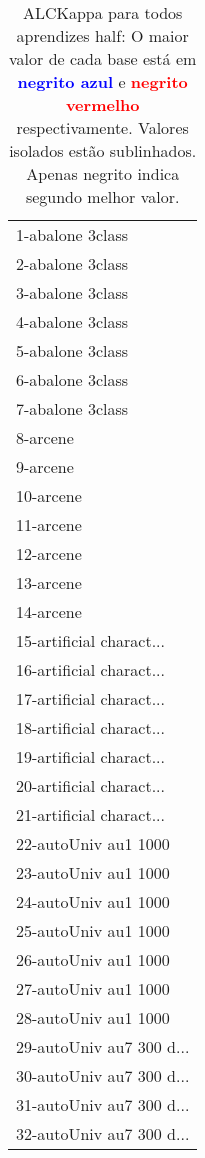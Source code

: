 \begin{table}[h]
\caption{ALCKappa para todos aprendizes half: O maior valor de cada base está em \textcolor{blue}{\textbf{negrito azul}} e \textcolor{red}{\textbf{negrito vermelho}} respectivamente. Valores isolados estão sublinhados. Apenas negrito indica segundo melhor valor.}
\begin{center}\begin{tabular}{l}
 & \\ \hline 1-abalone 3class &  \\
2-abalone 3class &  \\
3-abalone 3class &  \\
4-abalone 3class &  \\
5-abalone 3class &  \\
6-abalone 3class &  \\
7-abalone 3class &  \\ \hline
8-arcene &  \\
9-arcene &  \\
10-arcene &  \\
11-arcene &  \\
12-arcene &  \\
13-arcene &  \\
14-arcene &  \\ \hline
15-artificial charact... &  \\
16-artificial charact... &  \\
17-artificial charact... &  \\
18-artificial charact... &  \\
19-artificial charact... &  \\
20-artificial charact... &  \\
21-artificial charact... &  \\ \hline
22-autoUniv au1 1000 &  \\
23-autoUniv au1 1000 &  \\
24-autoUniv au1 1000 &  \\
25-autoUniv au1 1000 &  \\
26-autoUniv au1 1000 &  \\
27-autoUniv au1 1000 &  \\
28-autoUniv au1 1000 &  \\ \hline
29-autoUniv au7 300 d... &  \\
30-autoUniv au7 300 d... &  \\
31-autoUniv au7 300 d... &  \\
32-autoUniv au7 300 d... &  \\\end{tabular}\label{stratsALCKappa0AllReduxb}
\end{center}
\end{table}
